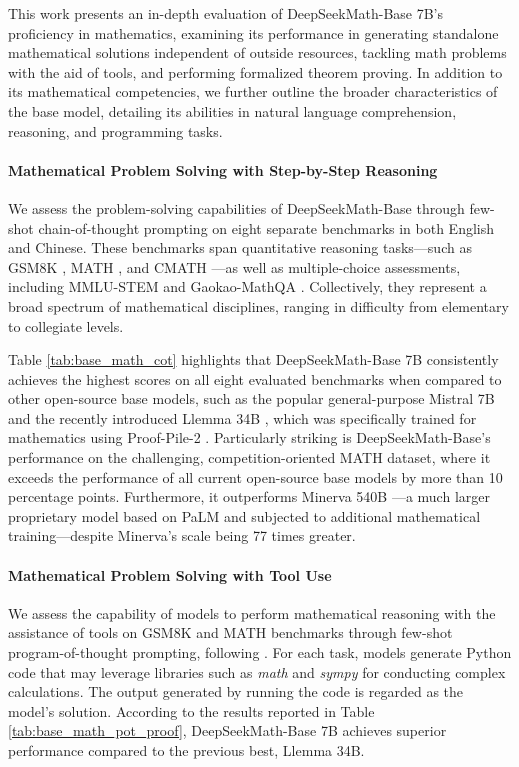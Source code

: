 \begin{itemize}[topsep=0pt]
This work presents an in-depth evaluation of DeepSeekMath-Base 7B's proficiency in mathematics, examining its performance in generating standalone mathematical solutions independent of outside resources, tackling math problems with the aid of tools, and performing formalized theorem proving. In addition to its mathematical competencies, we further outline the broader characteristics of the base model, detailing its abilities in natural language comprehension, reasoning, and programming tasks.

\paragraph{Mathematical Problem Solving with Step-by-Step Reasoning}

We assess the problem-solving capabilities of DeepSeekMath-Base through few-shot chain-of-thought prompting \citep{cot} on eight separate benchmarks in both English and Chinese. These benchmarks span quantitative reasoning tasks—such as GSM8K \citep{gsm8k}, MATH \citep{MATH}, and CMATH \citep{wei2023cmath}—as well as multiple-choice assessments, including MMLU-STEM \citep{mmlu} and Gaokao-MathQA \citep{agieval}. Collectively, they represent a broad spectrum of mathematical disciplines, ranging in difficulty from elementary to collegiate levels.

Table \ref{tab:base_math_cot} highlights that DeepSeekMath-Base 7B consistently achieves the highest scores on all eight evaluated benchmarks when compared to other open-source base models, such as the popular general-purpose Mistral 7B \citep{mistral} and the recently introduced Llemma 34B \citep{llemma}, which was specifically trained for mathematics using Proof-Pile-2 \citep{llemma}. Particularly striking is DeepSeekMath-Base's performance on the challenging, competition-oriented MATH dataset, where it exceeds the performance of all current open-source base models by more than 10 percentage points. Furthermore, it outperforms Minerva 540B \citep{minerva}—a much larger proprietary model based on PaLM \citep{palm} and subjected to additional mathematical training—despite Minerva's scale being 77 times greater.

\paragraph{Mathematical Problem Solving with Tool Use} We assess the capability of models to perform mathematical reasoning with the assistance of tools on GSM8K and MATH benchmarks through few-shot program-of-thought prompting, following \citet{pot,pal}. For each task, models generate Python code that may leverage libraries such as \textit{math} and \textit{sympy} for conducting complex calculations. The output generated by running the code is regarded as the model’s solution. According to the results reported in Table \ref{tab:base_math_pot_proof}, DeepSeekMath-Base 7B achieves superior performance compared to the previous best, Llemma 34B.


\end{itemize}
